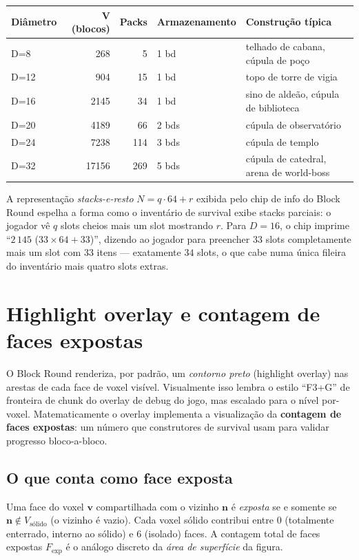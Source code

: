\documentclass[12pt,a4paper]{scrartcl}
\newcommand{\acc}[1]{\textcolor{accent}{\textbf{#1}}}
\begin{document}
\vspace{0.4em}
\begin{center}
\small
\begin{tabularx}{\textwidth}{@{}lrrlX@{}}
\toprule
\textbf{Diâmetro} & \textbf{V (blocos)} & \textbf{Packs} & \textbf{Armazenamento} & \textbf{Construção típica} \\
\midrule
D=8   &   268 &  5  &  1 bd & telhado de cabana, cúpula de poço  \\
D=12  &   904 & 15  &  1 bd & topo de torre de vigia \\
D=16  &  2145 & 34  &  1 bd & sino de aldeão, cúpula de biblioteca \\
D=20  &  4189 & 66  &  2 bds & cúpula de observatório \\
D=24  &  7238 & 114 &  3 bds & cúpula de templo \\
D=32  & 17156 & 269 &  5 bds & cúpula de catedral, arena de world-boss \\
\bottomrule
\end{tabularx}
\end{center}

A representação \emph{stacks-e-resto} $N = q \cdot 64 + r$ exibida pelo chip de info do Block Round espelha a forma como o inventário de survival exibe stacks parciais: o jogador vê $q$ slots cheios mais um slot mostrando $r$. Para $D=16$, o chip imprime \enquote{$2\,145$ ($33 \times 64 + 33$)}, dizendo ao jogador para preencher $33$ slots completamente mais um slot com $33$ itens --- exatamente $34$ slots, o que cabe numa única fileira do inventário mais quatro slots extras.

\section{Highlight overlay e contagem de faces expostas}

O Block Round renderiza, por padrão, um \emph{contorno preto} (highlight overlay) nas arestas de cada face de voxel visível. Visualmente isso lembra o estilo \enquote{F3+G} de fronteira de chunk do overlay de debug do jogo, mas escalado para o nível por-voxel. Matematicamente o overlay implementa a visualização da \acc{contagem de faces expostas}: um número que construtores de survival usam para validar progresso bloco-a-bloco.

\subsection{O que conta como face exposta}
Uma face do voxel $\mathbf{v}$ compartilhada com o vizinho $\mathbf{n}$ é \emph{exposta} se e somente se $\mathbf{n} \notin V_{\mathrm{sólido}}$ (o vizinho é vazio). Cada voxel sólido contribui entre $0$ (totalmente enterrado, interno ao sólido) e $6$ (isolado) faces. A contagem total de faces expostas $F_{\mathrm{exp}}$ é o análogo discreto da \emph{área de superfície} da figura.
\end{document}
